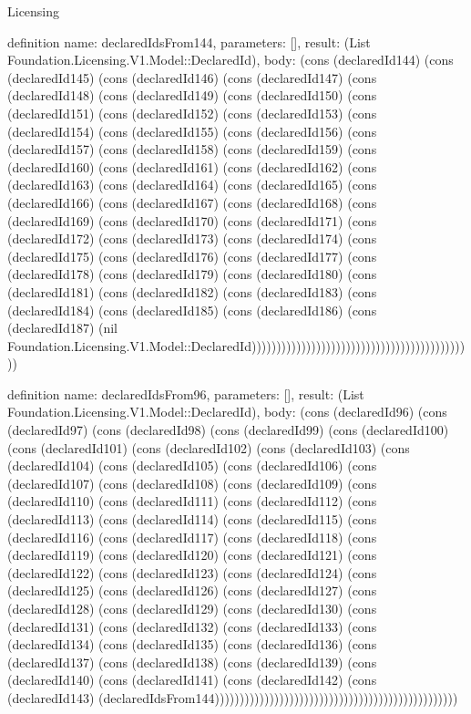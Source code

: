 \begin{lexlean}{Licensing}
\begin{semanticmodule}
definition{
  name: declaredIdsFrom144,
  parameters: [],
  result: (List Foundation.Licensing.V1.Model::DeclaredId),
  body: (cons (declaredId144) (cons (declaredId145) (cons (declaredId146) (cons (declaredId147) (cons (declaredId148) (cons (declaredId149) (cons (declaredId150) (cons (declaredId151) (cons (declaredId152) (cons (declaredId153) (cons (declaredId154) (cons (declaredId155) (cons (declaredId156) (cons (declaredId157) (cons (declaredId158) (cons (declaredId159) (cons (declaredId160) (cons (declaredId161) (cons (declaredId162) (cons (declaredId163) (cons (declaredId164) (cons (declaredId165) (cons (declaredId166) (cons (declaredId167) (cons (declaredId168) (cons (declaredId169) (cons (declaredId170) (cons (declaredId171) (cons (declaredId172) (cons (declaredId173) (cons (declaredId174) (cons (declaredId175) (cons (declaredId176) (cons (declaredId177) (cons (declaredId178) (cons (declaredId179) (cons (declaredId180) (cons (declaredId181) (cons (declaredId182) (cons (declaredId183) (cons (declaredId184) (cons (declaredId185) (cons (declaredId186) (cons (declaredId187) (nil Foundation.Licensing.V1.Model::DeclaredId)))))))))))))))))))))))))))))))))))))))))))))
}

definition{
  name: declaredIdsFrom96,
  parameters: [],
  result: (List Foundation.Licensing.V1.Model::DeclaredId),
  body: (cons (declaredId96) (cons (declaredId97) (cons (declaredId98) (cons (declaredId99) (cons (declaredId100) (cons (declaredId101) (cons (declaredId102) (cons (declaredId103) (cons (declaredId104) (cons (declaredId105) (cons (declaredId106) (cons (declaredId107) (cons (declaredId108) (cons (declaredId109) (cons (declaredId110) (cons (declaredId111) (cons (declaredId112) (cons (declaredId113) (cons (declaredId114) (cons (declaredId115) (cons (declaredId116) (cons (declaredId117) (cons (declaredId118) (cons (declaredId119) (cons (declaredId120) (cons (declaredId121) (cons (declaredId122) (cons (declaredId123) (cons (declaredId124) (cons (declaredId125) (cons (declaredId126) (cons (declaredId127) (cons (declaredId128) (cons (declaredId129) (cons (declaredId130) (cons (declaredId131) (cons (declaredId132) (cons (declaredId133) (cons (declaredId134) (cons (declaredId135) (cons (declaredId136) (cons (declaredId137) (cons (declaredId138) (cons (declaredId139) (cons (declaredId140) (cons (declaredId141) (cons (declaredId142) (cons (declaredId143) (declaredIdsFrom144)))))))))))))))))))))))))))))))))))))))))))))))))
}


\end{semanticmodule}
\end{lexlean}
